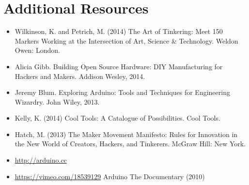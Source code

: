 \documentclass{../fal_assignment}
\begin{document}
\section*{Additional Resources}

\begin{itemize}
    \item Wilkinson, K. and Petrich, M. (2014) The Art of Tinkering: Meet 150 Markers Working at the Intersection of Art, Science \& Technology. Weldon Owen: London.
    \item Alicia Gibb. Building Open Source Hardware: DIY Manufacturing for Hackers and Makers. Addison Wesley, 2014. 
    \item Jeremy Blum. Exploring Arduino: Tools and Techniques for Engineering Wizardry. John Wiley, 2013. 
    \item Kelly, K. (2014) Cool Tools: A Catalogue of Possibilities. Cool Tools.
    \item Hatch, M. (2013) The Maker Movement Manifesto: Rules for Innovation in the New World of Creators, Hackers, and Tinkerers. McGraw Hill: New York.
    \item \url{http://arduino.cc}
    \item \url{https://vimeo.com/18539129} Arduino The Documentary (2010)
\end{itemize}
\end{document}

